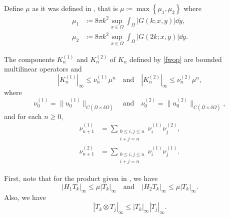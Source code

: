 \documentclass[a4paper, 12pt]{article}
\begin{document}
	Define $\mu$ as it was defined in , that is $\mu \coloneqq \max \left\{ \mu_1,\mu_2 \right\}$ where 
\begin{align*}
	\mu_1 &\coloneqq 8\pi k^2 \sup_{x \in \Omega}\int_{\Omega}^{} \left| G\left(k; x,y \right) \right|  \dd{y},\\
	\mu_{2}&\coloneqq 8\pi k^2 \sup_{x \in \Omega}\int_{\Omega}^{} \left| G\left(2k; x,y \right) \right|  \dd{y}
.\end{align*}

\begin{lem}\label{nuLem}
	The components $K_{n}^{(1)}$ and $K_{n}^{(2)}$ of $K_{n}$ defined by \cref{fwop} are bounded multilinear operators and
	\[
	\left| K_{n}^{(1)} \right|_{\infty} \le \nu_{n}^{(1)}\mu^{n}
	\quad \text{and} \quad
	\left| K_{n}^{(2)} \right|_{\infty} \le \nu_{n}^{(2)}\mu^{n}
	,\] 
	where
	\[
	\nu_0^{(1)} = \lVert u_0^{(1)} \rVert_{C\left( \overline{\Omega}\times \delta \Omega \right)}
	\quad \text{and} \quad
	\nu_0^{(2)} = \lVert u_0^{(2)} \rVert_{C\left( \overline{\Omega}\times \delta \Omega \right)}
	,\] 
	and for each $n \ge 0$,
	\begin{align}
		\label{nu1}\nu_{n + 1}^{(1)} &= \sum_{\substack{0\le i,j\le n\\i + j = n}} \nu_{i}^{(1)} \nu_{j}^{(2)},\\
		\label{nu2}\nu_{n + 1}^{(2)} &= \sum_{\substack{0\le i,j\le n\\i + j = n}} \nu_{i}^{(1)} \nu_{j}^{(1)}
	.\end{align} 
\end{lem}
	First, note that for the product given in , we have
	\[
		\left| H_1 T_{k} \right|_{\infty} \le \mu \left| T_{k} \right|_{\infty}
		\quad \text{and} \quad
		\left| H_2 T_{k} \right|_{\infty} \le \mu \left| T_{k} \right|_{\infty}
	.\] 
Also, we have
\[
	\left| T_{k}\otimes T_{j} \right|_{\infty} \le \left| T_{k} \right|_{\infty}\left| T_{j} \right|_{\infty}
.\] 
\end{document}
